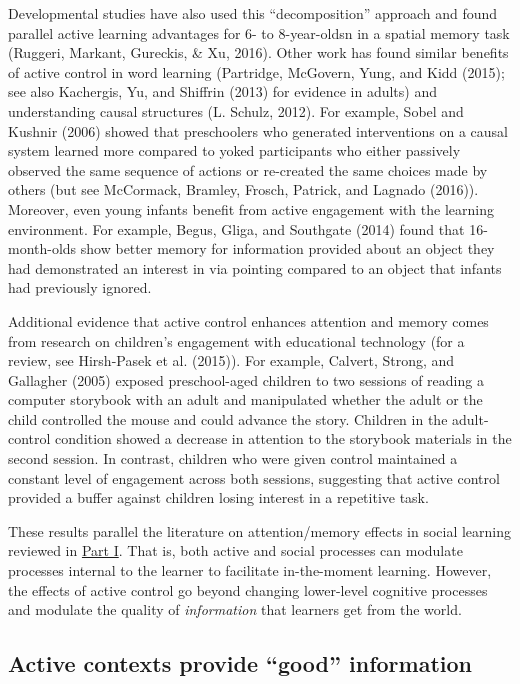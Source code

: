 \documentclass[english,floatsintext,man]{apa6}
\theoremstyle{definition}
\theoremstyle{definition}
\theoremstyle{definition}
\theoremstyle{remark}
\begin{document}
Developmental studies have also used this \enquote{decomposition}
approach and found parallel active learning advantages for 6- to
8-year-oldsn in a spatial memory task (Ruggeri, Markant, Gureckis, \&
Xu, 2016). Other work has found similar benefits of active control in
word learning (Partridge, McGovern, Yung, and Kidd (2015); see also
Kachergis, Yu, and Shiffrin (2013) for evidence in adults) and
understanding causal structures (L. Schulz, 2012). For example, Sobel
and Kushnir (2006) showed that preschoolers who generated interventions
on a causal system learned more compared to yoked participants who
either passively observed the same sequence of actions or re-created the
same choices made by others (but see McCormack, Bramley, Frosch,
Patrick, and Lagnado (2016)). Moreover, even young infants benefit from
active engagement with the learning environment. For example, Begus,
Gliga, and Southgate (2014) found that 16-month-olds show better memory
for information provided about an object they had demonstrated an
interest in via pointing compared to an object that infants had
previously ignored.

Additional evidence that active control enhances attention and memory
comes from research on children's engagement with educational technology
(for a review, see Hirsh-Pasek et al. (2015)). For example, Calvert,
Strong, and Gallagher (2005) exposed preschool-aged children to two
sessions of reading a computer storybook with an adult and manipulated
whether the adult or the child controlled the mouse and could advance
the story. Children in the adult-control condition showed a decrease in
attention to the storybook materials in the second session. In contrast,
children who were given control maintained a constant level of
engagement across both sessions, suggesting that active control provided
a buffer against children losing interest in a repetitive task.

These results parallel the literature on attention/memory effects in
social learning reviewed in \protect\hyperlink{p1}{Part I}. That is,
both active and social processes can modulate processes internal to the
learner to facilitate in-the-moment learning. However, the effects of
active control go beyond changing lower-level cognitive processes and
modulate the quality of \emph{information} that learners get from the
world.

\subsection{\texorpdfstring{Active contexts provide \enquote{good}
information}{Active contexts provide good information}}\label{active-contexts-provide-good-information}
\end{document}
